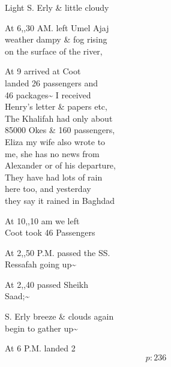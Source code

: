 \documentclass{report}
\begin{document}



	\par{
 	Light S. Erly \& little cloudy\ \\
	}

	\par{
 	At 6,,30 AM. left Umel Ajaj\ \\weather dampy \& fog rising\ \\on the surface of the river,\ \\
	}

	\par{
 	At 9 arrived at Coot\ \\landed 26 passengers and\ \\46 packages\~{} I received\ \\Henry's letter \& papers etc,\ \\The Khalifah had only about\ \\85000 Okes \& 160 passengers,\ \\Eliza my wife also wrote to\ \\me, she has no news from\ \\Alexander or of his departure,\ \\They have had lots of rain\ \\here too, and yesterday\ \\they say it rained in Baghdad\ \\
	}

	\par{
 	At 10,,10 am we left\ \\Coot took 46 Passengers\ \\
	}

	\par{
 	At 2,,50 P.M. passed the SS.\ \\Ressafah going up\~{}\ \\
	}

	\par{
 	At 2,,40 passed Sheikh\ \\Saad;\~{}\ \\
	}

	\par{
 	S. Erly breeze \& clouds again\ \\begin to gather up\~{}\ \\
	}

	\par{
 	At 6 P.M. landed 2\ \\
  \[p: 236 \]

	}
\end{document}
